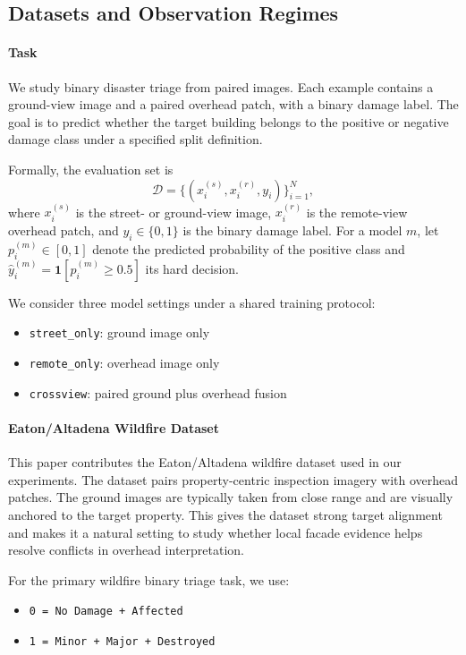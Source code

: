 \documentclass[sigconf]{acmart}
\begin{document}
\subsection{Datasets and Observation Regimes}

\paragraph{Task}

We study binary disaster triage from paired images. Each example contains a
ground-view image and a paired overhead patch, with a binary damage label. The
goal is to predict whether the target building belongs to the positive or
negative damage class under a specified split definition.

Formally, the evaluation set is
\begin{equation}
\mathcal{D}=\{(x_i^{(s)},x_i^{(r)},y_i)\}_{i=1}^{N},
\end{equation}
where $x_i^{(s)}$ is the street- or ground-view image,
$x_i^{(r)}$ is the remote-view overhead patch, and
$y_i\in\{0,1\}$ is the binary damage label. For a model $m$, let
$p_i^{(m)}\in[0,1]$ denote the predicted probability of the positive class and
$\hat{y}_i^{(m)}=\mathbf{1}[p_i^{(m)}\ge 0.5]$ its hard decision.

We consider three model settings under a shared training protocol:
\begin{itemize}
  \item \texttt{street\_only}: ground image only
  \item \texttt{remote\_only}: overhead image only
  \item \texttt{crossview}: paired ground plus overhead fusion
\end{itemize}

\paragraph{Eaton/Altadena Wildfire Dataset}

This paper contributes the Eaton/Altadena wildfire dataset used in our
experiments. The dataset pairs property-centric inspection imagery with
overhead patches. The ground images are typically taken from close range and
are visually anchored to the target property. This gives the dataset strong
target alignment and makes it a natural setting to study whether local facade
evidence helps resolve conflicts in overhead interpretation.

For the primary wildfire binary triage task, we use:
\begin{itemize}
  \item \texttt{0 = No Damage + Affected}
  \item \texttt{1 = Minor + Major + Destroyed}
\end{itemize}
\end{document}
